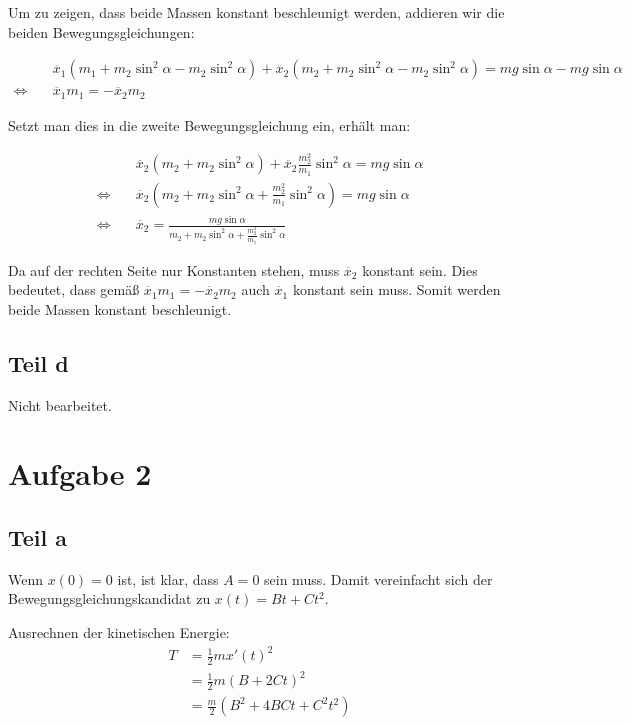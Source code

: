 \documentclass[a4paper,german,12pt,smallheadings]{scrartcl}
\begin{document}
Um zu zeigen, dass beide Massen konstant beschleunigt werden, addieren wir die beiden Bewegungsgleichungen:

\begin{align*}
&\ddot{x_1}(m_1+m_2 \sin^2 \alpha -m_2 \sin^2 \alpha)+\ddot{x_2}(m_2+m_2 \sin^2 \alpha - m_2 \sin^2 \alpha)=mg \sin \alpha - mg \sin \alpha \\
\Leftrightarrow\quad & \ddot{x_1} m_1 = -\ddot{x_2} m_2
\end{align*}

Setzt man dies in die zweite Bewegungsgleichung ein, erhält man:

\begin{align*}
  &\ddot{x_2}(m_2+m_2 \sin^2 \alpha) + \ddot{x_2} \frac{m_2^2}{m_1} \sin^2 \alpha = mg \sin \alpha \\
  \Leftrightarrow \quad &\ddot{x_2} (m_2+m_2 \sin^2 \alpha + \frac{m_2^2}{m_1} \sin^2 \alpha) = mg \sin \alpha \\
  \Leftrightarrow \quad &\ddot{x_2} = \frac{mg \sin \alpha}{m_2+m_2 \sin^2 \alpha + \frac{m_2^2}{m_1} \sin^2 \alpha}
\end{align*}

Da auf der rechten Seite nur Konstanten stehen, muss $\ddot{x_2}$ konstant
sein. Dies bedeutet, dass gemäß $\ddot{x_1} m_1 = -\ddot{x_2} m_2$ auch
$\ddot{x_1}$ konstant sein muss. Somit werden beide Massen konstant
beschleunigt.


\subsection*{Teil d}
Nicht bearbeitet.

\section*{Aufgabe 2}
\subsection*{Teil a}
Wenn $x(0) = 0$ ist, ist klar, dass $A=0$ sein muss. Damit vereinfacht sich der
Bewegungsgleichungskandidat zu $x(t) = Bt+Ct^2$.

Ausrechnen der kinetischen Energie:
\begin{align*}
  T &= \frac{1}{2}m x'(t)^2 \\
    &= \frac{1}{2}m (B+2Ct)^2 \\
    &= \frac{m}{2} (B^2 + 4BCt + C^2t^2)
\end{align*}
\end{document}
